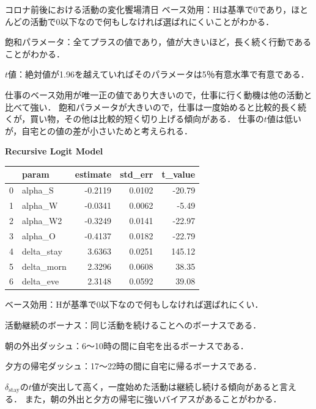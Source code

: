 \begin{column}{コロナ前後における活動の変化}{饗場清日}
ベース効用：Hは基準で0であり，ほとんどの活動で0以下なので何もしなければ選ばれにくいことがわかる．

飽和パラメータ：全てプラスの値であり，値が大きいほど，長く続く行動であることがわかる．

$t$値：絶対値が1.96を越えていればそのパラメータは5％有意水準で有意である．

仕事のベース効用が唯一正の値であり大きいので，仕事に行く動機は他の活動と比べて強い．
飽和パラメータが大きいので，仕事は一度始めると比較的長く続くが，買い物，その他は比較的短く切り上げる傾向がある．
仕事の$t$値は低いが，自宅との値の差が小さいためと考えられる．

\textbf{Recursive Logit Model}

\begin{center}
  \renewcommand{\arraystretch}{1.5}
  \setlength{\tabcolsep}{14pt}

  \begin{tabular}{clrrr}
    \toprule
    & \textbf{param} & \textbf{estimate} & \textbf{std\_err} & \textbf{t\_value} \\
    \midrule
    0 & alpha\_S      & -0.2119 & 0.0102 & -20.79 \\
    1 & alpha\_W      & -0.0341 & 0.0062 &  -5.49 \\
    2 & alpha\_W2     & -0.3249 & 0.0141 & -22.97 \\
    3 & alpha\_O      & -0.4137 & 0.0182 & -22.79 \\
    4 & delta\_stay   &  3.6363 & 0.0251 & 145.12 \\
    5 & delta\_morn   &  2.3296 & 0.0608 &  38.35 \\
    6 & delta\_eve    &  2.3148 & 0.0592 &  39.08 \\
    \bottomrule
  \end{tabular}
  \label{tab:mdcev-alpha-delta}
\end{center}

ベース効用：Hが基準で0以下なので何もしなければ選ばれにくい．

活動継続のボーナス：同じ活動を続けることへのボーナスである．

朝の外出ダッシュ：6〜10時の間に自宅を出るボーナスである．

夕方の帰宅ダッシュ：17〜22時の間に自宅に帰るボーナスである．

$\delta_{\text{stay}}$の$t$値が突出して高く，一度始めた活動は継続し続ける傾向があると言える．
また，朝の外出と夕方の帰宅に強いバイアスがあることがわかる．


\end{column}
